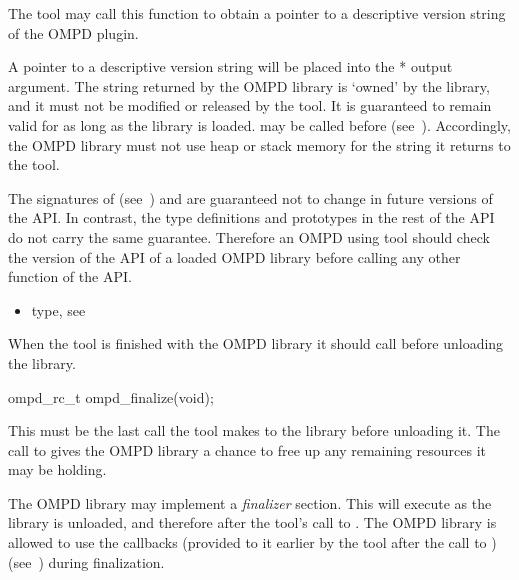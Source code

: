 \descr
The tool may call this function to obtain a pointer to a descriptive version string of the OMPD plugin.

\argdesc
A pointer to a descriptive version string will be placed into the * output argument.
The string returned by the
OMPD library is `owned' by the library, and it must not be modified or released by the tool.
It is guaranteed to remain valid for as long as the library is loaded.
may be called before  (see~).
Accordingly, the OMPD library must not use heap or
stack memory for the string it returns to the tool.

The signatures of  (see~)
and  are
guaranteed not to change in future versions of the API. In contrast, the type definitions and
prototypes in the rest of the API do not carry the same guarantee. Therefore an OMPD using tool
should check the version of the API of a loaded OMPD library before calling any other function of
the API.

\crossreferences
\begin{itemize}
	\item {} type, see 
\end{itemize}

\label{subsubsubsec:ompd_finalize}

\summary
When the tool is finished with the OMPD library it should call  before
unloading the library.

\format

\begin{cspecific}
\begin{ompSyntax}
ompd_rc_t ompd_finalize(void);
\end{ompSyntax}
\end{cspecific}


\descr
This must be the last call the tool makes to the library before
unloading it. The call to  gives the OMPD library a chance to
free up any remaining resources it may be holding.

The OMPD library may implement a \emph{finalizer} section. This will execute as the library is
unloaded, and therefore after the tool's call to . The OMPD library is allowed
to use the callbacks (provided to it earlier by the tool after the call to
) (see~) during finalization.

